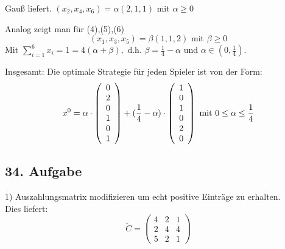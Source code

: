 \documentclass[a4paper,11pt,twoside,titlepage]{article}
\begin{document}
Gauß liefert. $(x_2,x_4,x_6)=\alpha(2,1,1)$ mit $\alpha \ge 0$

Analog zeigt man für (4),(5),(6)\\
\[(x_1,x_3,x_5)=\beta(1,1,2) \mbox{ mit }\beta\ge0\]
Mit $\sum\limits_{i=1}^6x_i=1=4(\alpha+\beta),$ d.h. $\beta=\frac{1}{4}-\alpha$ und $\alpha\in(0,\frac{1}{4})$.

Insgesamt: Die optimale Strategie für jeden Spieler ist von der Form:
\[x^0=\alpha\cdot\left(\begin{array}{c}0\\2\\0\\1\\0\\1\end{array}\right)+(\frac{1}{4}-\alpha)\cdot\left(\begin{array}{c}1\\0\\1\\0\\2\\0\end{array}\right)\textnormal{ mit } 0\le \alpha \le \frac{1}{4}\]

\subsection*{34. Aufgabe}

1) Auszahlungsmatrix modifizieren um echt positive Einträge zu erhalten.\\
Dies liefert:
\[\widetilde{C}= \left(\begin{array}{ccc}4&2&1\\2&4&4\\5&2&1\end{array}\right) \]
\end{document}
